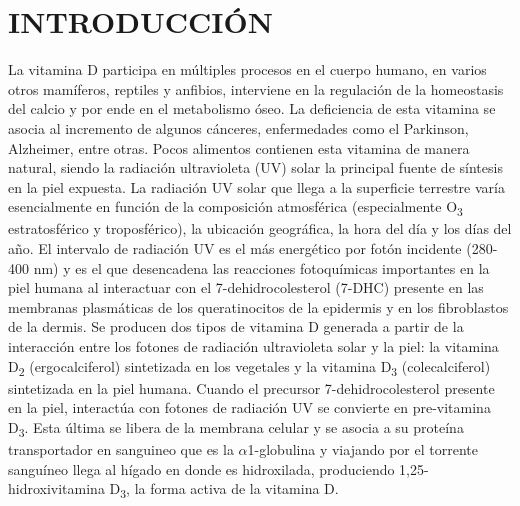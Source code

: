 \documentclass[10pt,twocolumn]{article}
\begin{document}
\section{INTRODUCCIÓN}
La vitamina D participa en múltiples procesos en el cuerpo humano, en varios otros mamíferos, reptiles y anfibios, interviene en la regulación de la homeostasis del calcio y por ende en el metabolismo óseo. La deficiencia de esta vitamina se asocia al incremento de algunos cánceres, enfermedades como el Parkinson, Alzheimer, entre otras.\cite{Zittermann2011,Afzal2013,KRAVIETZ201750} Pocos alimentos contienen esta vitamina de manera natural, siendo la radiación ultravioleta (UV) solar la principal fuente de síntesis en la piel expuesta. La radiación UV solar que llega a la superficie terrestre varía esencialmente en función de la composición atmosférica (especialmente O\textsubscript{3} estratosférico y troposférico), la ubicación geográfica, la hora del día y los días del año. El  intervalo de radiación UV es el más energético por fotón incidente (280-400 nm) y es el que desencadena las reacciones fotoquímicas importantes en la piel humana al interactuar con el 7-dehidrocolesterol (7-DHC) presente en las membranas plasmáticas de los queratinocitos de la epidermis y en los fibroblastos de la dermis.\cite{2002,brunser_radiacion_2005,Olds2008} Se producen dos tipos de vitamina D generada a partir de la interacción entre los fotones de radiación ultravioleta solar y la piel: la vitamina D\textsubscript{2} (ergocalciferol) sintetizada en los vegetales y la vitamina D\textsubscript{3} (colecalciferol) sintetizada en la piel humana.\cite{Zhang2010} Cuando el precursor 7-dehidrocolesterol presente en la piel, interactúa con fotones de radiación UV se convierte en pre-vitamina D\textsubscript{3}. Esta última se libera de la membrana celular y se asocia a su proteína transportador en sanguineo que es la $\alpha$1-globulina y viajando por el torrente sanguíneo llega al hígado en donde es hidroxilada, produciendo 1,25-hidroxivitamina D\textsubscript{3}, la forma activa de la vitamina D.\cite{brunser_radiacion_2005}
\end{document}
